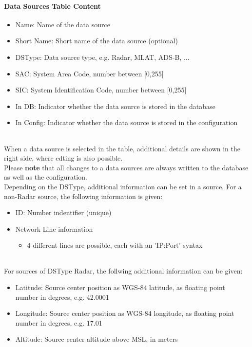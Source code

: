 \paragraph {Data Sources Table Content}
\label{sec:configure_datasources_table_content}

\begin{itemize}
\item Name: Name of the data source
\item Short Name: Short name of the data source (optional)
\item DSType: Data source type, e.g. Radar, MLAT, ADS-B, ...
\item SAC: System Area Code, number between [0,255]
\item SIC: System Identification Code, number between [0,255]
\item In DB: Indicator whether the data source is stored in the database
\item In Config: Indicator whether the data source is stored in the configuration
\end{itemize}
\ \\

When a data source is selected in the table, additional details are shown in the right side, where edting is also possible. \\

Please \textbf{note} that all changes to a data sources are always written to the database as well as the configuration. \\

Depending on the DSType, additional information can be set in a source. For a non-Radar source, the following information is given:

\begin{itemize}
\item ID: Number indentifier (unique)
\item Network Line information
\begin{itemize}
    \item 4 different lines are possible, each with an 'IP:Port' syntax
\end{itemize}
\end{itemize}
\ \\

For sources of DSType Radar, the follwing additional information can be given:

\begin{itemize}
\item Latitude: Source center position as WGS-84 latitude, as floating point number in degrees, e.g. 42.0001
\item Longitude: Source center position as WGS-84 longitude, as floating point number in degrees, e.g. 17.01
\item Altitude: Source center altitude above MSL, in meters
\end{itemize}
\ \\

